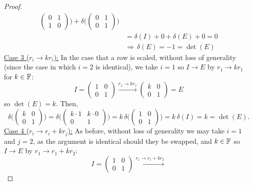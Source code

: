 \documentclass{exam}
\begin{document}
\begin{solution}
\begin{proof}
\begin{align*}
\begin{pmatrix}
          0 & 1 \\
          1 & 0 
         \end{pmatrix}\Biggr)
         + \delta\Biggl(\begin{pmatrix}
          0 & 1 \\
          0 & 1 
         \end{pmatrix}\Biggr) \\
        &= \delta(I) + 0 + \delta(E) + 0 = 0 \\
        &\Rightarrow\, \delta(E) = -1 = \det(E)
      \end{align*}
      \newline\underline{Case 3 ($r_i \to k r_i$):} In the case that a row is scaled, without loss of generality (since the case in which $i = 2$ is identical), we take $i = 1$ so $I \to E$ by $r_1 \to k r_1$ for $k \in \mathbb F$: 
      \[
        I = \begin{pmatrix}
          1 & 0 \\
          0 & 1
        \end{pmatrix} 
        \xrightarrow{r_1 \to k r_1} 
        \begin{pmatrix}
          k & 0 \\
          0 & 1
        \end{pmatrix} = E
      \]
      so $\det(E) = k$. Then, 
      \[
        \delta\Biggl(\begin{pmatrix} 
          k & 0 \\ 0 & 1 
        \end{pmatrix}\Biggr)
        = \delta\Biggl(\begin{pmatrix} 
          k\cdot 1 & k\cdot 0 \\ 0 & 1 
        \end{pmatrix}\Biggr)
        = k\,\delta\Biggl(\begin{pmatrix} 
          1 & 0 \\ 0 & 1 
        \end{pmatrix}\Biggr)
        = k\,\delta(I) = k = \det(E).
      \]
      \newline\underline{Case 4 ($r_i \to r_i + k r_j$):} As before, without loss of generality we may take $i = 1$ and $j = 2$, as the argument is identical should they be swapped, and $k \in \mathbb F$ so $I \to E$ by $r_1 \to r_1 + k r_2$: 
      \[
        I = \begin{pmatrix}
          1 & 0 \\
          0 & 1
        \end{pmatrix}
        \xrightarrow{r_1 \to r_1 + k r_2}
\]
\end{proof}
\end{solution}
\end{document}
